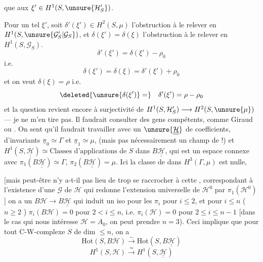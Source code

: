 que    aux
$\xi'\in H^1(S,\unsure{\mathcal H'_S})$.

Pour un tel  $\xi'$, soit
$\delta'(\xi')\in H^2(S,\mu)$
l'obstruction à le relever en $H^1(S,\unsure{\mathcal G'_S|\mathcal G_S})$,
et $\delta(\xi')=\delta(\xi)$ l'obstruction à le relever
en $H^1(S,\mathcal G_S)$. 
\[
\delta'(\xi')=\delta(\xi')-\rho_0
\]
i.e.
\[
\delta(\xi')=\delta(\xi)=\delta'(\xi')+\rho_0
\]
et on veut $\delta(\xi)=\rho$ i.e.
\[
\deleted{\unsure{\delta(\xi')}=}\quad
\delta'(\xi')=\rho-\rho_0
\]
et la question revient encore à  
surjectivité de $H^1(S,\mathcal H'_S)\longrightarrow H^2(S,\unsure{\mu})$
--- je ne m'en tire pas. Il faudrait
consulter des gens compétents, comme
Giraud ou . On sent qu'il
faudrait travailler avec un  $\unsure{\underline{\underline{\mathcal H}}}$
de coefficients, d'invariants $\underline{\pi}_0\simeq\Gamma$ et
$\underline{\pi}_1\simeq\mu$,
(mais pas nécessairement un champ de !)
 et
$H^1(S,\underline{\underline{\mathcal H}})\simeq\text{Classes d'applications}$
de $S$ dans $B\underline{\underline{\mathcal H}}$, qui est un espace
connexe avec $\pi_1(B\underline{\underline{\mathcal H}})\simeq\Gamma$,
$\pi_2(B\underline{\underline{\mathcal H}})=\mu$.
Ici la classe de  dans $H^3(\Gamma,\mu)$ est nulle,

[mais peut-être n'y a-t-il pas lieu de
trop se raccrocher à cette ,
correspondant à l'existence d'une  $\mathcal G$ de $\mathcal H$
 
qui redonne l'extension universelle de
$\mathcal H^0$ par $\pi_1(\mathcal H^0)$] on a un 
$B\mathcal H\longrightarrow B\underline{\underline{\mathcal H}}$
 qui induit un iso pour
les $\pi_i$ pour $i\leq2$, et pour $i\leq n$
( $n\geq2$ )
 $\pi_i(B\mathcal H)=0$ pour $2<i\leq n$, i.e.
$\pi_i(\mathcal H)=0$ pour $2\leq i\leq n-1$ [dans le cas
qui nous intéresse $\mathcal H=A_0$, on peut
prendre $n=3$). Ceci implique que pour
tout C-W-complexe $S$ de dim $\leq n$,
on a 
\[
\mathrm{Hot}(S,B\mathcal H)\xrightarrow{\sim}
\mathrm{Hot}(S,B\underline{\underline{\mathcal H}})
\]
\[
H^1(S,\mathcal H)\xrightarrow{\simeq}
H^1(S,\underline{\underline{\mathcal H}})
\]

